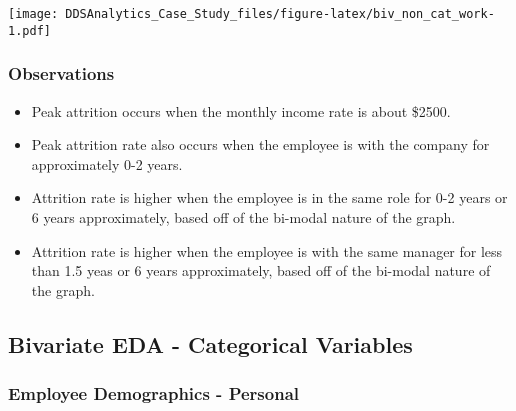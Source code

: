 \documentclass[]{article}
\providecommand{\tightlist}{%
  \setlength{\itemsep}{0pt}\setlength{\parskip}{0pt}}
\begin{document}
\texttt{[image: DDSAnalytics\_Case\_Study\_files/figure-latex/biv\_non\_cat\_work-1.pdf]}

\subsubsection{Observations}\label{observations-7}

\begin{itemize}
\tightlist
\item
  Peak attrition occurs when the monthly income rate is about \$2500.
\item
  Peak attrition rate also occurs when the employee is with the company
  for approximately 0-2 years.
\item
  Attrition rate is higher when the employee is in the same role for 0-2
  years or 6 years approximately, based off of the bi-modal nature of
  the graph.
\item
  Attrition rate is higher when the employee is with the same manager
  for less than 1.5 yeas or 6 years approximately, based off of the
  bi-modal nature of the graph.
\end{itemize}

\subsection{Bivariate EDA - Categorical
Variables}\label{bivariate-eda---categorical-variables}

\subsubsection{Employee Demographics -
Personal}\label{employee-demographics---personal-1}
\end{document}
